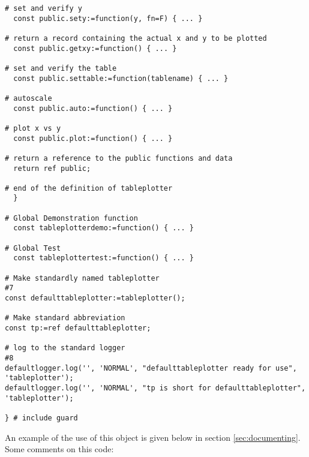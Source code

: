 \begin{verbatim}
# set and verify y
  const public.sety:=function(y, fn=F) { ... }

# return a record containing the actual x and y to be plotted
  const public.getxy:=function() { ... }

# set and verify the table
  const public.settable:=function(tablename) { ... }

# autoscale
  const public.auto:=function() { ... }

# plot x vs y
  const public.plot:=function() { ... }
  
# return a reference to the public functions and data
  return ref public;
  
# end of the definition of tableplotter
  }

# Global Demonstration function
  const tableplotterdemo:=function() { ... }

# Global Test
  const tableplottertest:=function() { ... }

# Make standardly named tableplotter                                  #7
const defaulttableplotter:=tableplotter();

# Make standard abbreviation
const tp:=ref defaulttableplotter;

# log to the standard logger                                          #8
defaultlogger.log('', 'NORMAL', "defaulttableplotter ready for use", 'tableplotter');
defaultlogger.log('', 'NORMAL', "tp is short for defaulttableplotter", 'tableplotter');
  
} # include guard
\end{verbatim}

An example of the use of this object is given below in
section \ref{sec:documenting}. Some comments on this code:

